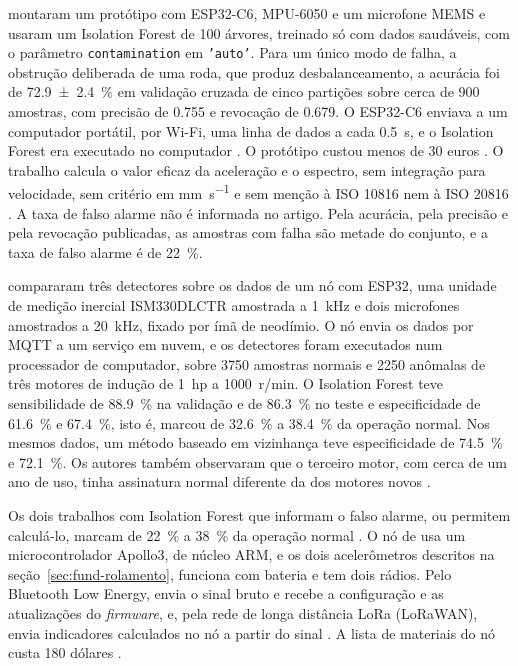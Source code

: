  montaram um protótipo com ESP32-C6, MPU-6050 e um microfone MEMS e usaram um Isolation Forest de \num{100} árvores, treinado só com dados saudáveis, com o parâmetro \texttt{contamination} em \texttt{'auto'}. Para um único modo de falha, a obstrução deliberada de uma roda, que produz desbalanceamento, a acurácia foi de \SI{72,9 \pm 2,4}{\percent} em validação cruzada de cinco partições sobre cerca de \num{900} amostras, com precisão de \num{0,755} e revocação de \num{0,679}. O ESP32-C6 enviava a um computador portátil, por Wi-Fi, uma linha de dados a cada \SI{0,5}{\second}, e o Isolation Forest era executado no computador \cite[p.~5, 13]{kolok2025}. O protótipo custou menos de \num{30} euros \cite[p.~4]{kolok2025}. O trabalho calcula o valor eficaz da aceleração e o espectro, sem integração para velocidade, sem critério em \si{\milli\meter\per\second} e sem menção à ISO 10816 nem à ISO 20816 \cite{kolok2025}. A taxa de falso alarme não é informada no artigo. Pela acurácia, pela precisão e pela revocação publicadas, as amostras com falha são metade do conjunto, e a taxa de falso alarme é de \SI{22}{\percent}.

 compararam três detectores sobre os dados de um nó com ESP32, uma unidade de medição inercial ISM330DLCTR amostrada a \SI{1}{\kilo\hertz} e dois microfones amostrados a \SI{20}{\kilo\hertz}, fixado por ímã de neodímio. O nó envia os dados por MQTT a um serviço em nuvem, e os detectores foram executados num processador de computador, sobre \num{3750} amostras normais e \num{2250} anômalas de três motores de indução de 1~hp a \SI{1000}{r/min}. O Isolation Forest teve sensibilidade de \SI{88,9}{\percent} na validação e de \SI{86,3}{\percent} no teste e especificidade de \SI{61,6}{\percent} e \SI{67,4}{\percent}, isto é, marcou de \SI{32,6}{\percent} a \SI{38,4}{\percent} da operação normal. Nos mesmos dados, um método baseado em vizinhança teve especificidade de \SI{74,5}{\percent} e \SI{72,1}{\percent}. Os autores também observaram que o terceiro motor, com cerca de um ano de uso, tinha assinatura normal diferente da dos motores novos \cite{chevtchenko2023}.

Os dois trabalhos com Isolation Forest que informam o falso alarme, ou permitem calculá-lo, marcam de \SI{22}{\percent} a \SI{38}{\percent} da operação normal \cite{chevtchenko2023,kolok2025}. O nó de  usa um microcontrolador Apollo3, de núcleo ARM, e os dois acelerômetros descritos na seção~\ref{sec:fund-rolamento}, funciona com bateria e tem dois rádios. Pelo Bluetooth Low Energy, envia o sinal bruto e recebe a configuração e as atualizações do \textit{firmware}, e, pela rede de longa distância LoRa (LoRaWAN), envia indicadores calculados no nó a partir do sinal \cite[p.~1, 3]{jakobsen2024}. A lista de materiais do nó custa \num{180} dólares \cite[p.~1]{jakobsen2024}.

